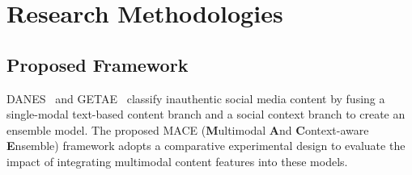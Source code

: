   \section{Research Methodologies}

  \subsection{Proposed Framework}

  DANES~\citep{truica2024danes} and GETAE~\citep{GETAE2025} classify inauthentic social media content by fusing a single-modal text-based content branch and a social context branch to create an ensemble model. The proposed MACE (\textbf{M}ultimodal \textbf{A}nd \textbf{C}ontext-aware \textbf{E}nsemble) framework adopts a comparative experimental design to evaluate the impact of integrating multimodal content features into these models.


